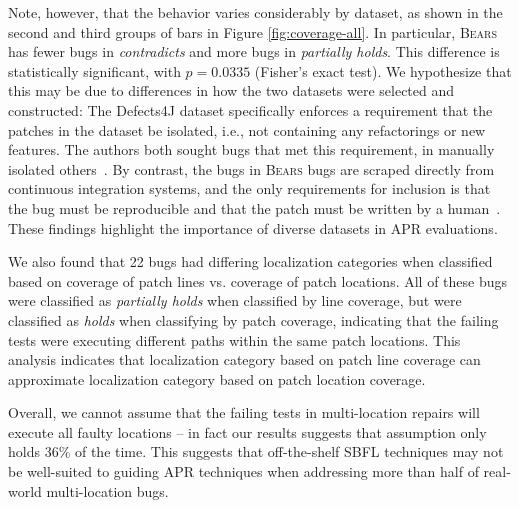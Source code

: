 \documentclass[10pt,journal,compsoc]{IEEEtran}
\newcommand\bears{\textsc{Bears}\xspace}
\begin{document}
Note, however, that the behavior varies considerably by dataset, as shown in the second and 
third groups of bars in Figure \ref{fig:coverage-all}. In particular, \bears has fewer bugs in 
\emph{contradicts} and more bugs in \emph{partially holds}.
This difference is statistically significant, with $p = 0.0335$ (Fisher's exact test).
We hypothesize that this may be due to differences in how the two  
datasets were selected and constructed:
The Defects4J dataset specifically enforces a requirement that the patches in the 
dataset be isolated, i.e., not containing any refactorings or new features.
The authors both sought bugs that met this requirement, in manually isolated others~\cite{defects4j}. By contrast, the 
bugs in 
\bears bugs are scraped directly from continuous integration systems, and the 
only requirements for inclusion is that the bug must be reproducible and that
the patch must be written by a human~\cite{bears}. 
These findings highlight the importance of diverse datasets
in APR evaluations. 

We also found that 22 bugs had differing localization categories when 
classified based on coverage of patch lines vs. coverage of patch locations. All of these 
bugs 
were classified as \emph{partially holds} when classified by line coverage, but were classified as 
\emph{holds} when classifying by patch coverage, indicating that the failing tests were 
executing different paths within the same patch locations. 
This analysis indicates that localization category based on patch line coverage can approximate
localization category based on patch location coverage.

Overall, we cannot assume that the failing tests in multi-location repairs will execute all 
faulty locations -- in fact our results suggests that assumption only holds 36\% of the time. 
This suggests that off-the-shelf SBFL techniques may not be
well-suited to guiding APR techniques when addressing more than half of
real-world multi-location bugs.
\end{document}

